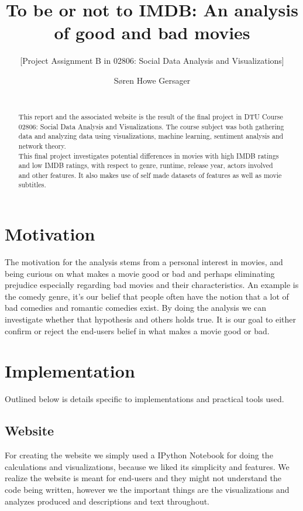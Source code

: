 \documentclass{acm_proc_article-sp}
\begin{document}
\title{To be or not to IMDB: An analysis of good and bad movies}
\subtitle{[Project Assignment B in 02806: Social Data Analysis and Visualizations]
}
\author
{
	\alignauthor Søren Howe Gersager\\
       \\
}
\maketitle
\begin{abstract}
This report and the associated website\cite{website} is the result of the final project in DTU Course 02806: Social Data Analysis and Visualizations. The course subject was both gathering data and analyzing data using visualizations, machine learning, sentiment analysis and network theory.\\
This final project investigates potential differences in movies with high IMDB ratings and low IMDB ratings, with respect to genre, runtime, release year, actors involved and other features. It also makes use of self made datasets of features as well as movie subtitles.
\end{abstract}

\section{Motivation}
The motivation for the analysis stems from a personal interest in movies, and being curious on what makes a movie good or bad and perhaps eliminating prejudice especially regarding bad movies and their characteristics. An example is the comedy genre, it's our belief that people often have the notion that a lot of bad comedies and romantic comedies exist. By doing the analysis we can investigate whether that hypothesis and others holds true. It is our goal to either confirm or reject the end-users belief in what makes a movie good or bad.  
\section{Implementation}
Outlined below is details specific to implementations and practical tools used.
\subsection{Website}
For creating the website we simply used a IPython Notebook for doing the calculations and visualizations, because we liked its simplicity and features. We realize the website is meant for end-users and they might not understand the code being written, however we the important things are the visualizations and analyzes produced and descriptions and text throughout.
\end{document}
